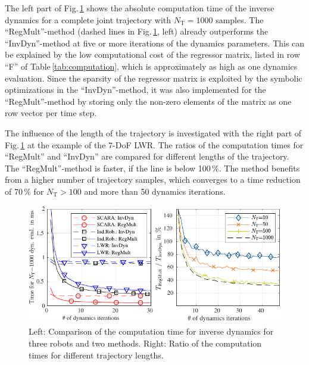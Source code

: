 \documentclass{svproc}
\begin{document}
The left part of Fig.\,\ref{fig:timing_evaluation} shows the absolute computation time of the inverse dynamics for a complete joint trajectory with $N_{\mathrm{T}}{=}1000$ samples.
%
The ``RegMult''-method (dashed lines in Fig.\,\ref{fig:timing_evaluation}, left) already outperforms the ``InvDyn''-method at five or more iterations of the dynamics parameters.
This can be explained by the low computational cost of the regressor matrix, listed in row ``F'' of Table\,\ref{tab:computation}, which is approximately as high as one dynamics evaluation.
Since the sparsity of the regressor matrix is exploited by the symbolic optimizations in the ``InvDyn''-method, it was also implemented for the ``RegMult''-method by storing only the non-zero elements of the matrix as one row vector per time step.

The influence of the length of the trajectory is investigated with the right part of Fig.\,\ref{fig:timing_evaluation} at the example of the 7-DoF LWR.
The ratios of the computation times for ``RegMult'' and ``InvDyn'' are compared for different lengths of the trajectory.
The ``RegMult''-method is faster, if the line is below 100\,\%.
The method benefits from a higher number of trajectory samples, which converges to a time reduction of 70\,\% for $N_{\mathrm{T}}>100$ and more than 50 dynamics iterations.

\begin{figure}[tb]
    \includegraphics{./figures/dyn_timing_eval.pdf}
    \caption{Left: Comparison of the computation time for inverse dynamics for three robots and two methods. Right: Ratio of the computation times for different trajectory lengths.}
    \label{fig:timing_evaluation}
\end{figure} 
\end{document}
